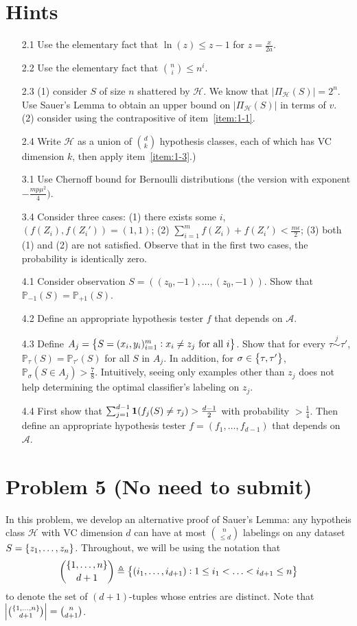 \documentclass{article}
\newcommand{\PP}{\mathbb{P}} %
\newcommand{\Acal}{\mathcal{A}} %
\newcommand{\Hcal}{\mathcal{H}} %
\newcommand{\defeq}{\triangleq}
\newcommand*{\one}{{\bf 1}}
\begin{document}
\section*{Hints}
\begin{enumerate}
  \item[2.1] Use the elementary fact that $\ln(z) \leq z - 1$ for $z = \frac{x}{2a}$.
  \item[2.2] Use the elementary fact that ${n \choose i} \leq n^i$.
  \item[2.3] (1) consider $S$ of size $n$ shattered by $\Hcal$. We know that
  $|\Pi_\Hcal(S)| = 2^n$.
  Use Sauer's Lemma to obtain an upper bound on $|\Pi_\Hcal(S)|$ in terms of $v$. (2)
  consider using the contrapositive of item~\ref{item:1-1}.
  \item[2.4] Write $\Hcal$ as a union of $d \choose k$ hypothesis classes, each of which has VC dimension $k$, then apply item~\ref{item:1-3}.)
  \item[3.1] Use Chernoff bound for Bernoulli distributions (the version with exponent $-\frac{m p\mu^2}{4})$.
  \item[3.4] Consider three cases: (1) there exists some $i$, $(f(Z_i), f(Z_i')) = (1,1)$; (2) $\sum_{i=1}^m f(Z_i) + f(Z_i') < \frac{m\epsilon}{2}$; (3) both (1) and (2) are not satisfied. Observe that in the first two cases, the probability is identically zero.

  \item[4.1] Consider observation $S = ((z_0,-1), \ldots, (z_0,-1))$. Show that $\PP_{-1}(S) = \PP_{+1}(S)$.
  \item[4.2] Define an appropriate hypothesis tester $f$ that depends on $\Acal$.
  \item[4.3] Define $A_j = \cbr{S = (x_i, y_i)_{i=1}^m: x_i \neq z_j \text{ for all } i}$. Show that for every $\tau \stackrel{j}{\sim} \tau'$, $\PP_{\tau}(S) = \PP_{\tau'}(S)$ for all $S$ in $A_j$. In addition, for
   $\sigma \in \cbr{\tau, \tau'}$, $\PP_\sigma(S \in A_j) > \frac78$. Intuitively,
  seeing only examples other than $z_j$ does not help determining the optimal classifier's labeling on $z_j$.
  \item[4.4] First show that $\sum_{j=1}^{d-1} \one(f_j(S) \neq \tau_j) > \frac{d-1}{2}$ with probability $> \frac14$. Then define an appropriate hypothesis tester $f = (f_1,\ldots,f_{d-1})$ that depends on $\Acal$.
\end{enumerate}


\section*{Problem 5 (No need to submit)}
In this problem, we develop an alternative proof of Sauer's Lemma: any hypotheis class $\Hcal$ with VC dimension $d$ can have at most ${n \choose {\leq d}}$ labelings
on any dataset $S = \cbr{z_1,\ldots,z_n}$. Throughout, we will be using the notation that
\[ {\cbr{1,\ldots,n} \choose d+1} \defeq \cbr{(i_1, \ldots, i_{d+1}): 1 \leq i_1 < \ldots < i_{d+1} \leq n} \]
to denote the set of $(d+1)$-tuples whose entries are distinct.
Note that $\abs{{\cbr{1,\ldots,n} \choose {d+1}}} = {n \choose {d+1}}$.
\end{document}
